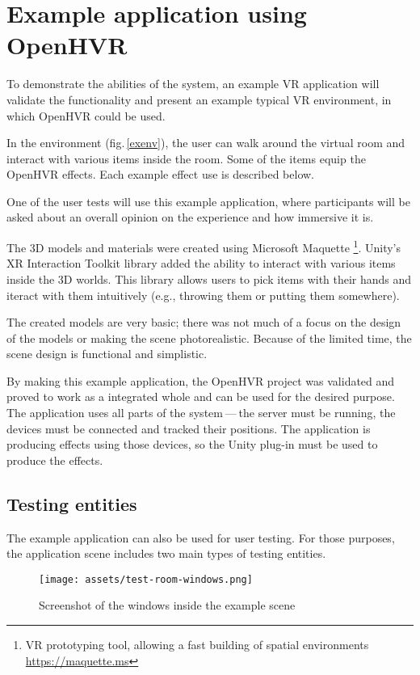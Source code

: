 \chapter{Example application using OpenHVR}

To demonstrate the abilities of the system, an example VR application
will validate the functionality and present an example typical VR
environment, in which OpenHVR could be used.

In the environment (fig.\,\ref{exenv}), the user can walk around the virtual 
room and interact with various items inside the room. Some of the items equip the OpenHVR
effects. Each example effect use is described below.

One of the user tests will use this example application, where
participants will be asked about an overall opinion on the experience and
how immersive it is.

The 3D models and materials were created using Microsoft Maquette
\footnote{VR prototyping tool, allowing a fast building of spatial environments \href{https://maquette.ms}{https://maquette.ms}}.
Unity’s XR Interaction Toolkit library added the ability to
interact with various items inside the 3D worlds. This library allows users to
pick items with their hands and iteract with them intuitively (e.g., throwing them
or putting them somewhere).


The created models are very basic; there was not much of a focus on the design
of the models or making the scene photorealistic. Because of the limited time,
the scene design is functional and simplistic.


By making this example application, the OpenHVR project was validated and proved
to work as a integrated whole and can be used for the desired purpose. The application uses
all parts of the system — the server must be running, the devices must be
connected and tracked their positions. The application is producing effects
using those devices, so the Unity plug-in must be used to produce the effects.

\hypertarget{x-testing-entities}{\section{Testing entities}}
The example application can also be used for user testing. For those purposes,
the application scene includes two main types of testing entities.

\newpage

\begin{figure}[h]{}
    \centering\texttt{[image: assets/test-room-windows.png]}
    \caption{Screenshot of the windows inside the example scene}
    \end{figure}

